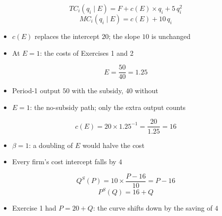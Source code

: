 \documentclass{beamer}
\begin{document}
\begin{frame}[plain,label=w3_cost_E]
  \Large
  \[
    \tag{23}\;TC_i(q_i \mid E) = F + c(E) \times q_i + 5\,q_i^2
  \]
  \[
    \tag{24}\;MC_i(q_i \mid E) = c(E) + 10\,q_i
  \]
  \vspace{0.3em}
  \begin{itemize}\Large
    \item $c(E)$ replaces the intercept $20$; the slope $10$ is unchanged
    \item At $E = 1$: the costs of Exercises 1 and 2
  \end{itemize}
\end{frame}

\begin{frame}[plain,label=w3_wt3_experience]
  \Large
  \[
    \tag{25}\;E = \frac{50}{40} = 1.25
  \]
  \vspace{0.3em}
  \begin{itemize}\Large
    \item Period-1 output $50$ with the subsidy, $40$ without
    \item $E = 1$: the no-subsidy path; only the extra output counts
  \end{itemize}
\end{frame}

\begin{frame}[plain,label=w3_wt3_cost]
  \Large
  \[
    \tag{26}\;c(E) = 20 \times 1.25^{-1} = \frac{20}{1.25} = 16
  \]
  \vspace{0.3em}
  \begin{itemize}\Large
    \item $\beta = 1$: a doubling of $E$ would halve the cost
    \item Every firm's cost intercept falls by $4$
  \end{itemize}
\end{frame}

\begin{frame}[plain,label=w3_wt4_supply]
  \Large
  \[
    \tag{27}\;Q^S(P) = 10 \times \frac{P - 16}{10} = P - 16
  \]
  \[
    \tag{28}\;P^S(Q) = 16 + Q
  \]
  \vspace{0.3em}
  \begin{itemize}\Large
    \item Exercise 1 had $P = 20 + Q$: the curve shifts down by the saving of $4$
  \end{itemize}
\end{frame}
\end{document}
